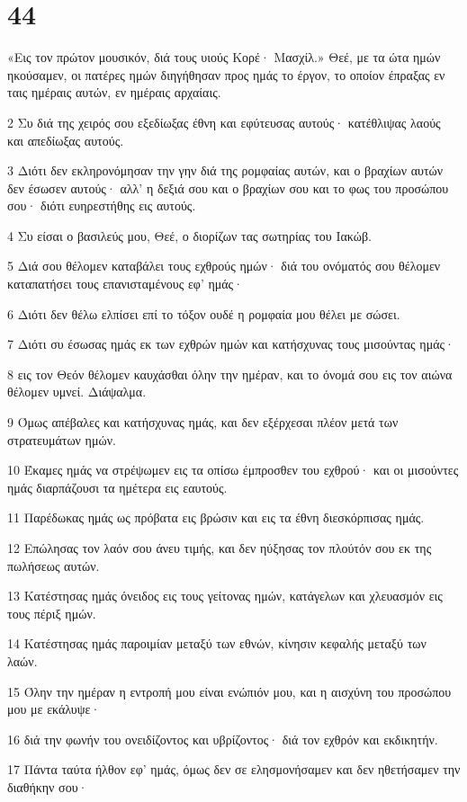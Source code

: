 \chapter{44}

\par «Εις τον πρώτον μουσικόν, διά τους υιούς Κορέ· Μασχίλ.» Θεέ, με τα ώτα ημών ηκούσαμεν, οι πατέρες ημών διηγήθησαν προς ημάς το έργον, το οποίον έπραξας εν ταις ημέραις αυτών, εν ημέραις αρχαίαις.
\par 2 Συ διά της χειρός σου εξεδίωξας έθνη και εφύτευσας αυτούς· κατέθλιψας λαούς και απεδίωξας αυτούς.
\par 3 Διότι δεν εκληρονόμησαν την γην διά της ρομφαίας αυτών, και ο βραχίων αυτών δεν έσωσεν αυτούς· αλλ' η δεξιά σου και ο βραχίων σου και το φως του προσώπου σου· διότι ευηρεστήθης εις αυτούς.
\par 4 Συ είσαι ο βασιλεύς μου, Θεέ, ο διορίζων τας σωτηρίας του Ιακώβ.
\par 5 Διά σου θέλομεν καταβάλει τους εχθρούς ημών· διά του ονόματός σου θέλομεν καταπατήσει τους επανισταμένους εφ' ημάς·
\par 6 Διότι δεν θέλω ελπίσει επί το τόξον ουδέ η ρομφαία μου θέλει με σώσει.
\par 7 Διότι συ έσωσας ημάς εκ των εχθρών ημών και κατήσχυνας τους μισούντας ημάς·
\par 8 εις τον Θεόν θέλομεν καυχάσθαι όλην την ημέραν, και το όνομά σου εις τον αιώνα θέλομεν υμνεί. Διάψαλμα.
\par 9 Όμως απέβαλες και κατήσχυνας ημάς, και δεν εξέρχεσαι πλέον μετά των στρατευμάτων ημών.
\par 10 Έκαμες ημάς να στρέψωμεν εις τα οπίσω έμπροσθεν του εχθρού· και οι μισούντες ημάς διαρπάζουσι τα ημέτερα εις εαυτούς.
\par 11 Παρέδωκας ημάς ως πρόβατα εις βρώσιν και εις τα έθνη διεσκόρπισας ημάς.
\par 12 Επώλησας τον λαόν σου άνευ τιμής, και δεν ηύξησας τον πλούτόν σου εκ της πωλήσεως αυτών.
\par 13 Κατέστησας ημάς όνειδος εις τους γείτονας ημών, κατάγελων και χλευασμόν εις τους πέριξ ημών.
\par 14 Κατέστησας ημάς παροιμίαν μεταξύ των εθνών, κίνησιν κεφαλής μεταξύ των λαών.
\par 15 Όλην την ημέραν η εντροπή μου είναι ενώπιόν μου, και η αισχύνη του προσώπου μου με εκάλυψε·
\par 16 διά την φωνήν του ονειδίζοντος και υβρίζοντος· διά τον εχθρόν και εκδικητήν.
\par 17 Πάντα ταύτα ήλθον εφ' ημάς, όμως δεν σε ελησμονήσαμεν και δεν ηθετήσαμεν την διαθήκην σου·
